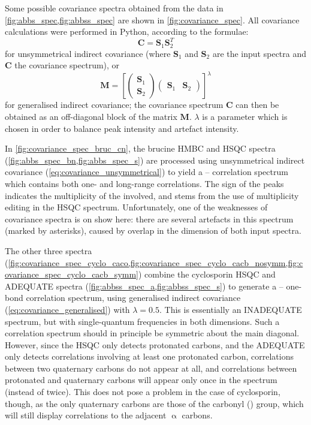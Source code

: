 Some possible covariance spectra obtained from the data in \cref{fig:abbs_spec,fig:abbss_spec} are shown in \cref{fig:covariance_spec}.
All covariance calculations were performed in Python, according to the formulae:
\begin{equation}
    \label{eq:covariance_unsymmetrical}
    \symbf{C} = \symbf{S}_1\symbf{S}_2^T
\end{equation}
for unsymmetrical indirect covariance (where $\symbf{S}_1$ and $\symbf{S}_2$ are the input spectra and $\symbf{C}$ the covariance spectrum), or
\begin{equation}
    \label{eq:covariance_generalised}
    \symbf{M} = \left[\begin{pmatrix}\symbf{S}_1 \\ \symbf{S}_2\end{pmatrix}
    \begin{pmatrix}\symbf{S}_1 & \symbf{S}_2 \end{pmatrix}\right]^\lambda
\end{equation}
for generalised indirect covariance; the covariance spectrum $\symbf{C}$ can then be obtained as an off-diagonal block of the matrix $\symbf{M}$.
$\lambda$ is a parameter which is chosen in order to balance peak intensity and artefact intensity\autocite{Snyder2009JPCA}.

In \cref{fig:covariance_spec_bruc_cn}, the brucine \nitrogen{} HMBC and \carbon{} HSQC spectra  (\cref{fig:abbs_spec_bn,fig:abbs_spec_s}) are processed using unsymmetrical indirect covariance (\cref{eq:covariance_unsymmetrical}) to yield a \carbon{}--\nitrogen{} correlation spectrum which contains both one- and long-range correlations.\autocite{Martin2007JHC,Martin2007MRC}
The sign of the peaks indicates the multiplicity of the \carbon{} involved, and stems from the use of multiplicity editing in the \carbon{} HSQC spectrum.
Unfortunately, one of the weaknesses of covariance spectra is on show here: there are several artefacts in this spectrum (marked by asterisks), caused by overlap in the \proton{} dimension of both input spectra.

The other three spectra (\cref{fig:covariance_spec_cyclo_caco,fig:covariance_spec_cyclo_cacb_nosymm,fig:covariance_spec_cyclo_cacb_symm}) combine the cyclosporin \carbon{} HSQC and ADEQUATE spectra (\cref{fig:abbss_spec_a,fig:abbss_spec_s}) to generate a \carbon{}--\carbon{} one-bond correlation spectrum, using generalised indirect covariance (\cref{eq:covariance_generalised}) with $\lambda = 0.5$.
This is essentially an INADEQUATE spectrum, but with single-quantum frequencies in both dimensions\autocite{Martin2011MRC,Martin2011MRC2}.
Such a correlation spectrum should in principle be symmetric about the main diagonal.
However, since the HSQC only detects protonated carbons, and the ADEQUATE only detects correlations involving at least one protonated carbon,
correlations between two quaternary carbons do not appear at all, and correlations between protonated and quaternary carbons will appear only once in the spectrum (instead of twice).
This does not pose a problem in the case of cyclosporin, though, as the only quaternary carbons are those of the carbonyl () group, which will still display correlations to the adjacent $\upalpha$ carbons.

